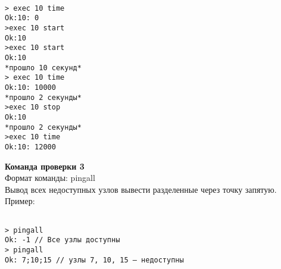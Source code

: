 \begin{verbatim}

> exec 10 time
Ok:10: 0
>exec 10 start
Ok:10
>exec 10 start
Ok:10
*прошло 10 секунд*
> exec 10 time
Ok:10: 10000
*прошло 2 секунды*
>exec 10 stop
Ok:10
*прошло 2 секунды*
>exec 10 time
Ok:10: 12000

\end{verbatim}



\textbf{Команда проверки 3}\\
Формат команды: pingall\\
Вывод всех недоступных узлов вывести разделенные через точку запятую.
Пример:
\begin{verbatim}

> pingall
Ok: -1 // Все узлы доступны
> pingall
Ok: 7;10;15 // узлы 7, 10, 15 — недоступны

\end{verbatim}

\pagebreak
